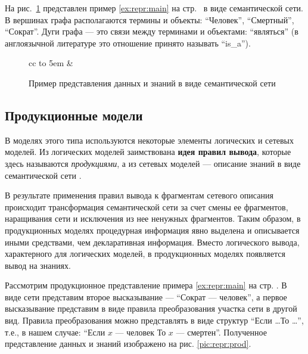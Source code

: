 \documentclass[12pt, openany, twoside]{book} %
\begin{document}
На рис.~\ref{pic:repr:semnet} представлен пример \ref{ex:repr:main} на стр.~\pageref{ex:repr:main} в виде семантической сети. В вершинах графа располагаются термины и объекты: ``Человек'', ``Смертный'', ``Сократ''. Дуги графа --- это связи между терминами и объектами: ``являться'' (в англоязычной литературе это отношение принято называть ``is\_a'').
\begin{figure}\small
\begin{center}%
  \begin{tabular}{cc}
	\hbox to 5em {} &
  \end{tabular}
%
%
\end{center}%
\caption{Пример представления данных и знаний в виде семантической сети}
\label{pic:repr:semnet}
\end{figure}

\subsection{Продукционные модели}

В моделях этого типа используются некоторые элементы логических и сетевых моделей. Из логических моделей заимствована {\bf идея правил вывода}, которые здесь называются {\em продукциями}, а из сетевых моделей --- описание знаний в виде семантической сети \cite{AIDictionary}.

В результате применения правил вывода к фрагментам сетевого описания происходит трансформация семантической сети за счет смены ее фрагментов, наращивания сети и исключения из нее ненужных фрагментов. Таким образом, в продукционных моделях процедурная информация явно выделена и описывается иными средствами, чем декларативная информация. Вместо логического вывода, характерного для логических моделей, в продукционных моделях появляется вывод на знаниях.

Рассмотрим продукционное представление примера \ref{ex:repr:main} на стр. \pageref{ex:repr:main}. В виде сети представим второе высказывание --- ``Сократ --- человек'', а первое высказывание представим в виде правила преобразования участка сети в другой вид. Правила преобразования можно представлять в виде структур ``Если \ldots То \ldots '', т.е., в нашем случае: ``Если $x$ --- человек То $x$ --- смертен''. Полученное представление данных и знаний изображено на рис. \ref{pic:repr:prod}.
\end{document}

